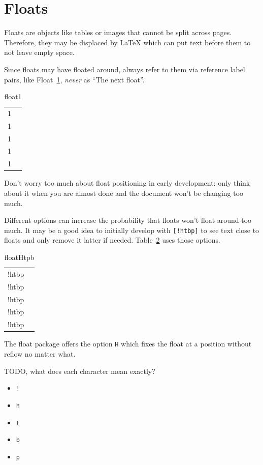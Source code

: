 \documentclass[12pt]{article}
\begin{document}
\section{Floats}\label{floats}

  Floats are objects like tables or images that cannot be split across pages.
  Therefore, they may be displaced by LaTeX which can put text before them to
  not leave empty space.

  Since floats may have floated around, always refer to them via reference label pairs,
  like Float~\ref{float1}, \emph{never} as ``The next float''.

  \begin{table}
    \begin{tabular}{cc}
      1 \\ 1 \\ 1 \\ 1 \\ 1 \\
    \end{tabular}
    \caption{float1}
    \label{float1}
  \end{table}

  Don't worry too much about float positioning in early development: only think about
  it when you are almost done and the document won't be changing too much.

  Different options can increase the probability that floats won't float around too much.
  It may be a good idea to initially develop with \lstinline|[!htbp]| to see text close to floats
  and only remove it latter if needed. Table~\ref{floatHtpb} uses those options.

  \begin{table}
    \begin{tabular}{cc}
      !htbp \\ !htbp \\ !htbp \\ !htbp \\ !htbp \\
    \end{tabular}
    \caption{floatHtpb}
    \label{floatHtpb}
  \end{table}

  The float package offers the option \lstinline|H| which fixes the float at a position without reflow no matter what.

  TODO, what does each character mean exactly?

  \begin{itemize}
    \item \lstinline|!|
    \item \lstinline|h|
    \item \lstinline|t|
    \item \lstinline|b|
    \item \lstinline|p|
  \end{itemize}
\end{document}
